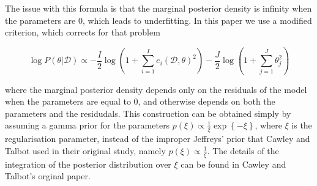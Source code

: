 \documentclass[11pt, oneside]{article}
\begin{document}
The issue with this formula is that the marginal posterior density is infinity when the parameters are 0, which leads to underfitting.
In this paper we use a modified criterion, which corrects for that problem 

\begin{equation}
	\log P(\theta | \mathcal{D}) \propto - \frac{I}{2} \log \left(1 + \sum_{i=1}^{I} e_i(\mathcal{D},\theta)^2\right) - \frac{J}{2} \log \left(1 + \sum_{j=1}^{J} \theta_{j}^2 \right)
\end{equation}

where the marginal posterior density depends only on the residuals of the model when the parameters are equal to 0, and otherwise depends on both the parameters and the residudals. 
This construction can be obtained simply by assuming a gamma prior for the parameters $p(\xi) \propto \frac{1}{\xi} \exp\left\{- \xi \right\}$, where $\xi$ is the regularisation parameter, instead of the improper Jeffreys' prior that Cawley and Talbot used in their original study, namely $p(\xi) \propto \frac{1}{\xi}$. 
The details of the integration of the posterior distribution over $\xi$ can be found in Cawley and Talbot's orginal paper.
\end{document}
